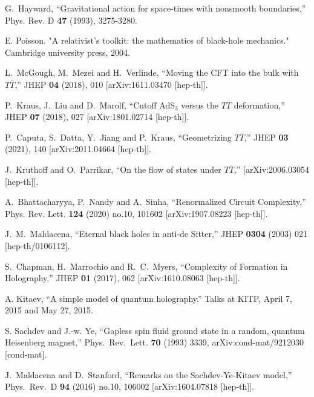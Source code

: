 \documentclass[a4paper,12pt]{article}
\begin{document}
\begin{thebibliography}{}
G.~Hayward,
``Gravitational action for space-times with nonsmooth boundaries,''
Phys. Rev. D \textbf{47} (1993), 3275-3280.

E. Poisson. "A relativist's toolkit: the mathematics of black-hole mechanics." Cambridge university press, 2004.


L.~McGough, M.~Mezei and H.~Verlinde,
``Moving the CFT into the bulk with $ T\overline{T} $,''
JHEP \textbf{04} (2018), 010
[arXiv:1611.03470 [hep-th]].

P.~Kraus, J.~Liu and D.~Marolf,
``Cutoff AdS$_{3}$ versus the $ T\overline{T} $ deformation,''
JHEP \textbf{07} (2018), 027
[arXiv:1801.02714 [hep-th]].

P.~Caputa, S.~Datta, Y.~Jiang and P.~Kraus,
``Geometrizing $ T\overline{T} $,''
JHEP \textbf{03} (2021), 140
[arXiv:2011.04664 [hep-th]].

J.~Kruthoff and O.~Parrikar,
``On the flow of states under $T\overline{T}$,''
[arXiv:2006.03054 [hep-th]].

A.~Bhattacharyya, P.~Nandy and A.~Sinha,
``Renormalized Circuit Complexity,''
Phys. Rev. Lett. \textbf{124} (2020) no.10, 101602
[arXiv:1907.08223 [hep-th]].

  J.~M.~Maldacena,
  ``Eternal black holes in anti-de Sitter,''  
  JHEP {\bf 0304} (2003) 021 %
[hep-th/0106112].  %

S.~Chapman, H.~Marrochio and R.~C.~Myers,
``Complexity of Formation in Holography,''
JHEP \textbf{01} (2017), 062
[arXiv:1610.08063 [hep-th]].

A. Kitaev, “A simple model of quantum holography.”
Talks at KITP, April 7, 2015 and May 27, 2015.

 S. Sachdev and J.-w. Ye, “Gapless spin fluid ground state in a random, quantum Heisenberg magnet,” 
 Phys.\ Rev.\ Lett. {\bf 70} (1993) 3339, arXiv:cond-mat/9212030 [cond-mat].

J.~Maldacena and D.~Stanford,
  ``Remarks on the Sachdev-Ye-Kitaev model,''
  Phys.\ Rev.\ D {\bf 94} (2016) no.10,  106002
  [arXiv:1604.07818 [hep-th]].


\end{thebibliography}
\end{document}
